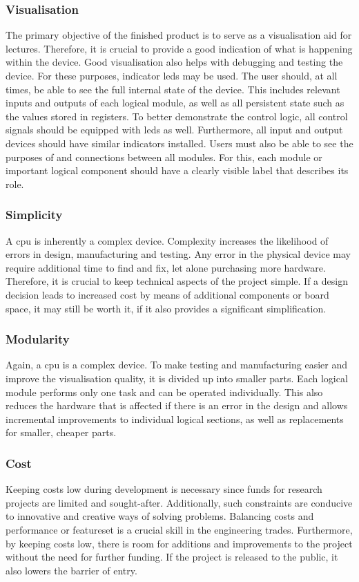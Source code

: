 \subsubsection*{Visualisation}

The primary objective of the finished product is to serve as a visualisation aid for lectures. Therefore, it is crucial to provide a good indication of what is happening within the device. Good visualisation also helps with debugging and testing the device. For these purposes, indicator \acp{led} may be used. The user should, at all times, be able to see the full internal state of the device. This includes relevant inputs and outputs of each logical module, as well as all persistent state such as the values stored in registers. To better demonstrate the control logic, all control signals should be equipped with \acp{led} as well. Furthermore, all input and output devices should have similar indicators installed. Users must also be able to see the purposes of and connections between all modules. For this, each module or important logical component should have a clearly visible label that describes its role.

\subsubsection*{Simplicity}

A \ac{cpu} is inherently a complex device. Complexity increases the likelihood of errors in design, manufacturing and testing. Any error in the physical device may require additional time to find and fix, let alone purchasing more hardware. Therefore, it is crucial to keep technical aspects of the project simple. If a design decision leads to increased cost by means of additional components or board space, it may still be worth it, if it also provides a significant simplification.

\subsubsection*{Modularity}

Again, a \ac{cpu} is a complex device. To make testing and manufacturing easier and improve the visualisation quality, it is divided up into smaller parts. Each logical module performs only one task and can be operated individually. This also reduces the hardware that is affected if there is an error in the design and allows incremental improvements to individual logical sections, as well as replacements for smaller, cheaper parts.

\subsubsection*{Cost}

Keeping costs low during development is necessary since funds for research projects are limited and sought-after. Additionally, such constraints are conducive to innovative and creative ways of solving problems. Balancing costs and performance or featureset is a crucial skill in the engineering trades. Furthermore, by keeping costs low, there is room for additions and improvements to the project without the need for further funding. If the project is released to the public, it also lowers the barrier of entry.
